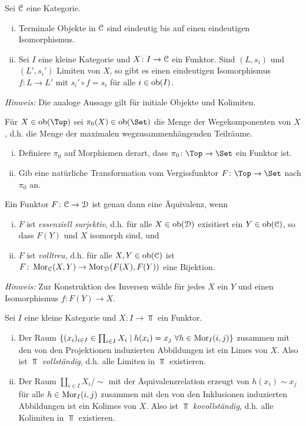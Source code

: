 \begin{aufgabe} Sei $\mathcal C$ eine Kategorie.
	\begin{enumerate}[(i)]
		\item Terminale Objekte in $\mathcal C$ sind eindeutig bis auf einen eindeutigen Isomorphismus.
		\item Sei $I$ eine kleine Kategorie und $X\colon I\to \mathcal C$ ein Funktor. Sind $(L,s_i)$ und $(L',s_i')$ Limiten von $X$, so gibt es einen eindeutigen Isomorphismus $f\colon L\to L'$ mit $s_i'\circ f=s_i$ für alle $i\in\textrm{ob}(I)$.
	\end{enumerate}
	\emph{Hinweis:} Die analoge Aussage gilt für initiale Objekte und Kolimiten.
\end{aufgabe}
\begin{aufgabe}
	Für $X\in\ob(\Top)$ sei $\pi_0(X)\in\ob(\Set)$ die Menge der Wegekomponenten von $X$, d.h. die Menge der maximalen wegzusammenhängenden Teilräume. 
	\begin{enumerate}[(i)]
		\item Definiere $\pi_0$ auf Morphismen derart, dass $\pi_0\colon \Top\to \Set$ ein Funktor ist.
		\item Gib eine natürliche Transformation vom Vergissfunktor $F\colon \Top\to\Set$ nach $\pi_0$ an.
	\end{enumerate}
\end{aufgabe}
\begin{aufgabe}
	Ein Funktor $F\colon\mathcal C\to\mathcal D$ ist genau dann eine Äquivalenz, wenn
	\begin{enumerate}[i)]
		\item $F$ ist \emph{essenziell surjektiv}, d.h. für alle $X\in\textrm{ob}(\mathcal D)$ exisitiert ein $Y\in\textrm{ob}(\mathcal C)$, so dass $F(Y)$ und $X$ isomorph sind, und
		\item $F$ ist \emph{volltreu}, d.h. für alle $X,Y\in\textrm{ob}(\mathcal C)$ ist $F\colon \operatorname{Mor}_\mathcal C(X,Y)\to \operatorname{Mor}_\mathcal D(F(X),F(Y))$ eine Bijektion.
	\end{enumerate}
	\emph{Hinweis:} Zur Konstruktion des Inversen wähle für jedes $X$ ein $Y$ und einen Isomorphismus $f\colon F(Y)\to X$.
\end{aufgabe}
\begin{aufgabe}
	Sei $I$ eine kleine Kategorie und $X\colon I\to\Top$ ein Funktor. 
	\begin{enumerate}[(i)]
		\item Der Raum $\{(x_i)_{i\in I}\in \prod_{i\in I} X_i\mid h(x_i)=x_j~\forall h\in\operatorname{Mor}_I(i,j)\}$ zusammen mit den von den Projektionen induzierten Abbildungen ist ein Limes von $X$. Also ist $\Top$ \emph{vollständig}, d.h. alle Limiten in $\Top$ existieren.
		\item Der Raum $\coprod_{i\in I}X_i/\sim$ mit der Äquivalenzrelation erzeugt von $h(x_i)\sim x_j$ für alle $h\in\operatorname{Mor}_I(i,j)$ zusammen mit den von den Inklusionen induzierten Abbildungen ist ein Kolimes von $X$. Also ist $\Top$ \emph{kovollständig}, d.h. alle Kolimiten in $\Top$ existieren.
	\end{enumerate}
\end{aufgabe}

